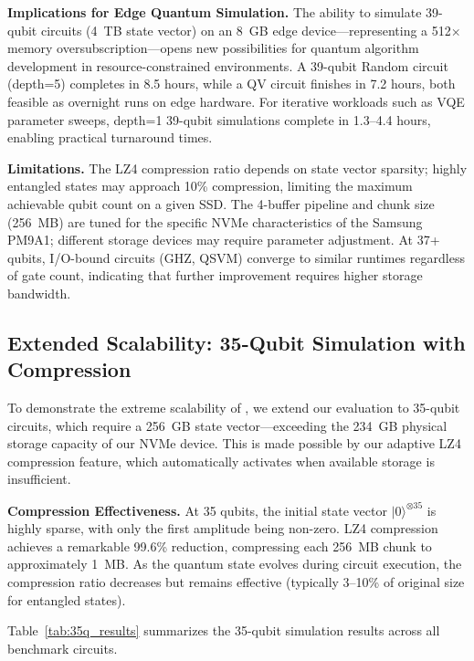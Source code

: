 \noindent\textbf{Implications for Edge Quantum Simulation.}
The ability to simulate 39-qubit circuits (4~TB state vector) on an 8~GB edge device---representing a 512$\times$ memory oversubscription---opens new possibilities for quantum algorithm development in resource-constrained environments.
A 39-qubit Random circuit (depth=5) completes in 8.5 hours, while a QV circuit finishes in 7.2 hours, both feasible as overnight runs on edge hardware.
For iterative workloads such as VQE parameter sweeps, depth=1 39-qubit simulations complete in 1.3--4.4 hours, enabling practical turnaround times.

\noindent\textbf{Limitations.}
The LZ4 compression ratio depends on state vector sparsity; highly entangled states may approach 10\% compression, limiting the maximum achievable qubit count on a given SSD.
The 4-buffer pipeline and chunk size (256~MB) are tuned for the specific NVMe characteristics of the Samsung PM9A1; different storage devices may require parameter adjustment.
At 37+ qubits, I/O-bound circuits (GHZ, QSVM) converge to similar runtimes regardless of gate count, indicating that further improvement requires higher storage bandwidth.


\subsection{Extended Scalability: 35-Qubit Simulation with Compression}
\label{sec:35qubit}

To demonstrate the extreme scalability of \EdgeQuantum, we extend our evaluation to 35-qubit circuits, which require a 256~GB state vector---exceeding the 234~GB physical storage capacity of our NVMe device.
This is made possible by our adaptive LZ4 compression feature, which automatically activates when available storage is insufficient.

\noindent\textbf{Compression Effectiveness.}
At 35 qubits, the initial state vector $|0\rangle^{\otimes 35}$ is highly sparse, with only the first amplitude being non-zero.
LZ4 compression achieves a remarkable 99.6\% reduction, compressing each 256~MB chunk to approximately 1~MB.
As the quantum state evolves during circuit execution, the compression ratio decreases but remains effective (typically 3--10\% of original size for entangled states).

Table~\ref{tab:35q_results} summarizes the 35-qubit simulation results across all benchmark circuits.

